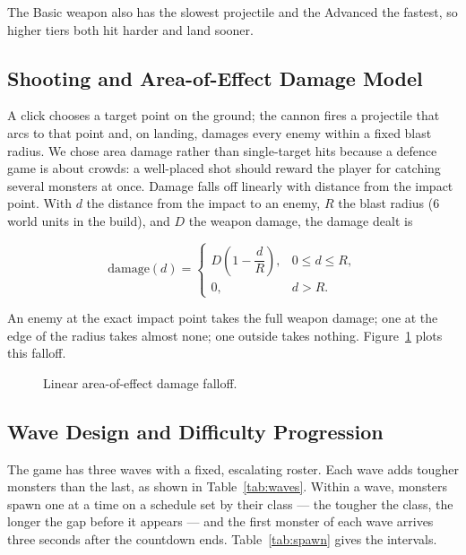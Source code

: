 \documentclass[12pt,a4paper]{report}
\begin{document}
The Basic weapon also has the slowest projectile and the Advanced the fastest,
so higher tiers both hit harder and land sooner.

\subsection{Shooting and Area-of-Effect Damage Model}

A click chooses a target point on the ground; the cannon fires a projectile that
arcs to that point and, on landing, damages every enemy within a fixed blast
radius. We chose area damage rather than single-target hits because a defence
game is about crowds: a well-placed shot should reward the player for catching
several monsters at once. Damage falls off linearly with distance from the
impact point. With $d$ the distance from the impact to an enemy, $R$ the blast
radius (6 world units in the build), and $D$ the weapon damage, the damage dealt
is

\begin{equation}
\text{damage}(d) =
\begin{cases}
D\left(1 - \dfrac{d}{R}\right), & 0 \le d \le R, \\[2mm]
0, & d > R.
\end{cases}
\end{equation}

An enemy at the exact impact point takes the full weapon damage; one at the edge
of the radius takes almost none; one outside takes nothing.
Figure~\ref{fig:falloff} plots this falloff.

\begin{figure}[h]
\centering
{}
\caption{Linear area-of-effect damage falloff.}
\label{fig:falloff}
\end{figure}

\subsection{Wave Design and Difficulty Progression}

The game has three waves with a fixed, escalating roster. Each wave adds tougher monsters
than the last, as shown in Table~\ref{tab:waves}. Within a wave, monsters spawn
one at a time on a schedule set by their class --- the tougher the class, the
longer the gap before it appears --- and the first monster of each wave arrives
three seconds after the countdown ends. Table~\ref{tab:spawn} gives the
intervals.
\end{document}
